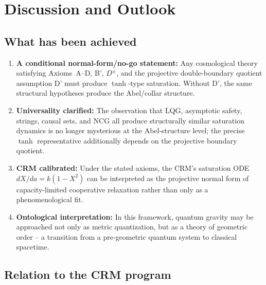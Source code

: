 \documentclass[aps,prd,twocolumn,superscriptaddress,nofootinbib]{revtex4-2}
\begin{document}
\section{Discussion and Outlook}
\label{sec:discussion}

\subsection{What has been achieved}

\begin{enumerate}
\item \textbf{A conditional normal-form/no-go statement:} Any cosmological theory satisfying Axioms~A--D, B', $D^\pm$, and the projective double-boundary quotient assumption D' must produce $\tanh$-type saturation. Without D', the same structural hypotheses produce the Abel/collar structure.

\item \textbf{Universality clarified:} The observation that LQG, asymptotic safety, strings, causal sets, and NCG all produce structurally similar saturation dynamics is no longer mysterious at the Abel-structure level; the precise $\tanh$ representative additionally depends on the projective boundary quotient.

\item \textbf{CRM calibrated:} Under the stated axioms, the CRM's saturation ODE $dX/da = k(1-X^2)$ can be interpreted as the projective normal form of capacity-limited cooperative relaxation rather than only as a phenomenological fit.

\item \textbf{Ontological interpretation:} In this framework, quantum gravity may be approached not only as metric quantization, but as a theory of geometric order -- a transition from a pre-geometric quantum system to classical spacetime.
\end{enumerate}

\subsection{Relation to the CRM program}
\end{document}
